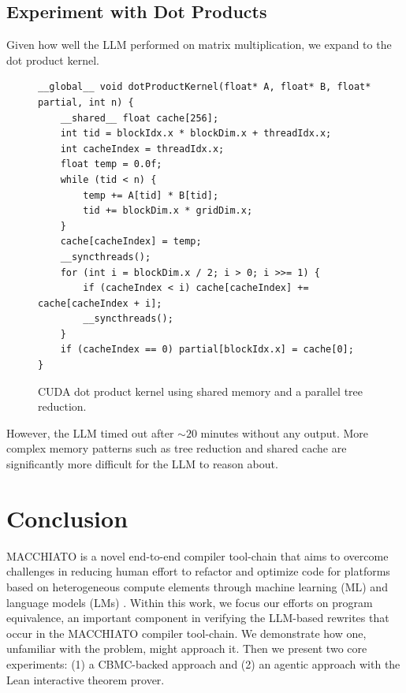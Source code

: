 \documentclass{article}
\begin{document}
\subsection{Experiment with Dot Products}

Given how well the LLM performed on matrix multiplication, we expand to the dot product kernel.

\begin{figure}[H]
\begin{verbatim}
__global__ void dotProductKernel(float* A, float* B, float* partial, int n) {
    __shared__ float cache[256];
    int tid = blockIdx.x * blockDim.x + threadIdx.x;
    int cacheIndex = threadIdx.x;
    float temp = 0.0f;
    while (tid < n) {
        temp += A[tid] * B[tid];
        tid += blockDim.x * gridDim.x;
    }
    cache[cacheIndex] = temp;
    __syncthreads();
    for (int i = blockDim.x / 2; i > 0; i >>= 1) {
        if (cacheIndex < i) cache[cacheIndex] += cache[cacheIndex + i];
        __syncthreads();
    }
    if (cacheIndex == 0) partial[blockIdx.x] = cache[0];
}
\end{verbatim}
\caption{CUDA dot product kernel using shared memory and a parallel tree reduction.}
\label{fig:dot-product-kernel}
\end{figure}

However, the LLM timed out after $\sim 20$ minutes without any output. More complex memory patterns such as tree reduction and shared cache are significantly more difficult for the LLM to reason about.  

\section{Conclusion}

MACCHIATO is a novel end-to-end compiler tool-chain that aims to overcome challenges in reducing human effort to refactor and optimize code for platforms based on heterogeneous compute elements through machine learning (ML) and language models (LMs) \cite{HR001124S0035}. Within this work, we focus our efforts on program equivalence, an important component in verifying the LLM-based rewrites that occur in the MACCHIATO compiler tool-chain. We demonstrate how one, unfamiliar with the problem, might approach it. Then we present two core experiments: (1) a CBMC-backed approach and (2) an agentic approach with the Lean interactive theorem prover. 

\newpage

\printbibliography[heading=bibintoc, title={References}]
\end{document}
